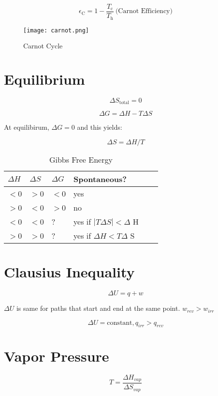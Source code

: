 \documentclass{article}
\begin{document}
\begin{equation*}
\epsilon_{\text{C}} = 1 - \frac{T_\text{c}}{T_\text{h}} \ \text{(Carnot Efficiency)}
\end{equation*}

\begin{figure}[h]
\centering
\texttt{[image: carnot.png]}
\caption{Carnot Cycle}
\end{figure}

\section{Equilibrium}
\begin{equation*}
\Delta S_{\text{total}} = 0
\end{equation*}

\begin{equation*}
\Delta G = \Delta H - T \Delta S
\end{equation*}

At equilibirum, $\Delta G =0$ and this yields:

\[
\Delta S = \Delta H/T 
\]
\begin{table}[h!]
\centering
\caption{Gibbs Free Energy}
\label{my-label}
\def\arraystretch{1.5}
\begin{tabular}{|l|l|l|l|l|l|}
\hline
$\Delta H$ & $\Delta S$ & $\Delta G$ & Spontaneous?  \\
\hline
$<$0 & $>$0 & $<$0 & yes \\
\hline
$>$0 & $<$0 & $>$0 & no\\
\hline
$<$0 & $<$0 & ? & yes if $|T\Delta S| < \Delta$ H  \\
\hline 
$>$0 & $>$0 & ? & yes if $\Delta H < T \Delta$ S \\
\hline
\end{tabular}
\end{table}

\section{Clausius Inequality}
\[
\Delta U = q + w
\]

$\Delta U$ is same for paths that start and end at the same point. $w_{rev} > w_{irr}$

\[
\Delta U = \text{constant}, q_{irr} > q_{rev}
\]

\section{Vapor Pressure}
\[
T = \frac{\Delta H_{vap}}{\Delta S_{vap}}
\]
\end{document}
